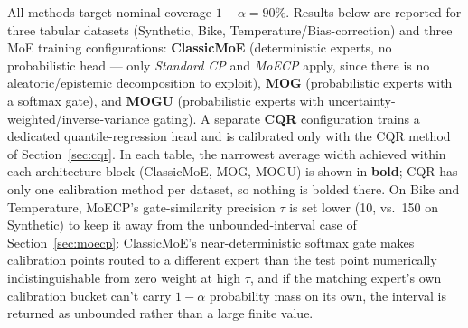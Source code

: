 \documentclass[11pt]{article}
\begin{document}
All methods target nominal coverage $1-\alpha = 90\%$. Results below are reported for three tabular
datasets (Synthetic, Bike, Temperature/Bias-correction) and three MoE training configurations:
\textbf{ClassicMoE} (deterministic experts, no probabilistic head — only \emph{Standard CP} and
\emph{MoECP} apply, since there is no aleatoric/epistemic decomposition to exploit), \textbf{MOG}
(probabilistic experts with a softmax gate), and \textbf{MOGU} (probabilistic experts with
uncertainty-weighted/inverse-variance gating). A separate \textbf{CQR} configuration trains a
dedicated quantile-regression head and is calibrated only with the CQR method of
Section~\ref{sec:cqr}. In each table, the narrowest average width achieved within each architecture
block (ClassicMoE, MOG, MOGU) is shown in \textbf{bold}; CQR has only one calibration method per
dataset, so nothing is bolded there. On Bike and Temperature, MoECP's gate-similarity precision
$\tau$ is set lower (10, vs.\ 150 on Synthetic) to keep it away from the unbounded-interval case of
Section~\ref{sec:moecp}: ClassicMoE's near-deterministic softmax gate makes calibration points
routed to a different expert than the test point numerically indistinguishable from zero weight at
high $\tau$, and if the matching expert's own calibration bucket can't carry $1-\alpha$ probability
mass on its own, the interval is returned as unbounded rather than a large finite value.
\end{document}
